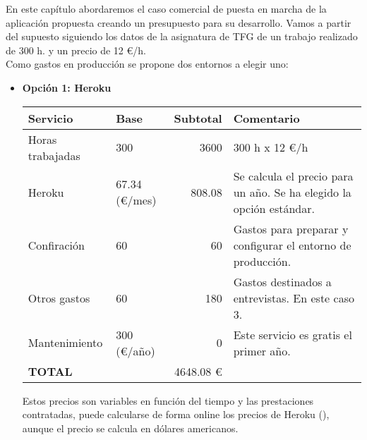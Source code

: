 

En este capítulo abordaremos el caso comercial de puesta en marcha de la aplicación propuesta creando un presupuesto para su desarrollo. Vamos a partir del supuesto siguiendo los datos de la asignatura de TFG de un trabajo realizado de 300 h. y un precio de 12 \euro/h. \\

Como gastos en producción se propone dos entornos a elegir uno:

\begin{itemize}

\item \textbf{Opción 1: Heroku}
\begin{center}
    \begin{tabular}{| l | l | r | p{5cm} |}
    \hline
    Servicio & Base & Subtotal & Comentario \\ \hline
    Horas trabajadas & 300 & 3600 & 300 h x 12 \euro/h \\ \hline
    Heroku & 67.34 (\euro/mes) & 808.08 & Se calcula el precio para un año. Se ha elegido la opción estándar.\\ \hline
    Confiración & 60 & 60 & Gastos para preparar y configurar el entorno de producción. \\ \hline 
    Otros gastos & 60 & 180 & Gastos destinados a entrevistas. En este caso 3. \\ \hline 
    Mantenimiento & 300 (\euro/año) & 0 & Este servicio es gratis el primer año. \\ \hline
    \textbf{TOTAL} &  & 4648.08 \euro &  \\
    \hline
    \end{tabular}
\end{center}

Estos precios son variables en función del tiempo y las prestaciones contratadas, puede calcularse de forma online los precios de Heroku (\cite{URL:Heroku_Pircing}), aunque el precio se calcula en dólares americanos. 


\end{itemize}

